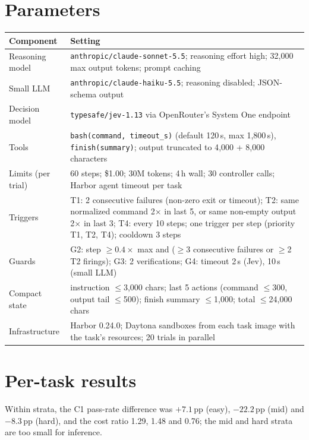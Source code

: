 \documentclass[10pt]{article}
\begin{document}
\section{Parameters}
\label{app:params}

\begin{center}\small
\begin{tabularx}{\linewidth}{@{}lX@{}}
  \toprule
  Component & Setting \\
  \midrule
  Reasoning model & \texttt{anthropic/claude-sonnet-5.5}; reasoning effort high; 32{,}000 max output tokens; prompt caching \\
  Small LLM & \texttt{anthropic/claude-haiku-5.5}; reasoning disabled; JSON-schema output \\
  Decision model & \texttt{typesafe/jev-1.13} via OpenRouter's System One endpoint \\
  Tools & \texttt{bash(command, timeout\_s)} (default 120\,s, max 1{,}800\,s), \texttt{finish(summary)}; output truncated to 4{,}000 + 8{,}000 characters \\
  Limits (per trial) & 60 steps; \$1.00; 30M tokens; 4\,h wall; 30 controller calls; Harbor agent timeout per task \\
  Triggers & T1: 2 consecutive failures (non-zero exit or timeout); T2: same normalized command 2$\times$ in last 5, or same non-empty output 2$\times$ in last 3; T4: every 10 steps; one trigger per step (priority T1, T2, T4); cooldown 3 steps \\
  Guards & G2: step $\geq 0.4\times$ max and ($\geq$3 consecutive failures or $\geq$2 T2 firings); G3: 2 verifications; G4: timeout 2\,s (Jev), 10\,s (small LLM) \\
  Compact state & instruction $\leq$3{,}000 chars; last 5 actions (command $\leq$300, output tail $\leq$500); finish summary $\leq$1{,}000; total $\leq$24{,}000 chars \\
  Infrastructure & Harbor 0.24.0; Daytona sandboxes from each task image with the task's resources; 20 trials in parallel \\
  \bottomrule
\end{tabularx}
\end{center}

\section{Per-task results}
\label{app:pertask}

Within strata, the C1 pass-rate difference was $+7.1$\,pp (easy), $-22.2$\,pp (mid) and $-8.3$\,pp (hard), and the cost ratio 1.29, 1.48 and 0.76; the mid and hard strata are too small for inference.
\end{document}
